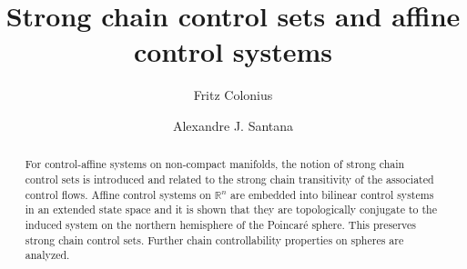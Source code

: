 \documentclass[preprint,12pt]{elsarticle}
\begin{document}
\begin{frontmatter}



\title{Strong chain control sets and affine control systems} %

\author{Fritz Colonius}

  \author{Alexandre J. Santana}



\begin{abstract}
 For control-affine systems on non-compact manifolds, the
notion of strong chain control sets is introduced and related to the strong chain
transitivity of the associated control flows. Affine control systems on
$\mathbb{R}^{n}$ are embedded into bilinear control systems in an extended
state space and it is shown that they are topologically conjugate to the
induced system on the northern hemisphere of the Poincar\'{e} sphere. This
preserves strong chain control sets. Further chain controllability properties
on spheres are analyzed.
\end{abstract}


\end{frontmatter}
\end{document}
